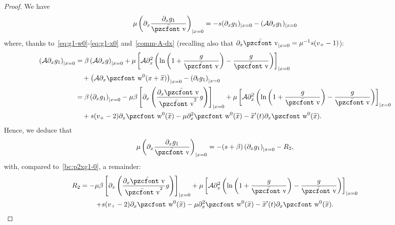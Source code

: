 \documentclass[10pt]{amsart}
\theoremstyle{definition}\newtheorem{defi}[theo]{Definition}\newtheorem{rema}[theo]{Remark}\newtheorem{exam}[theo]{Example}\newtheorem{exem}[theo]{Example}\newtheorem{nota}[theo]{Notation}
\newcommand{\mathpzc}[1]{\text{\pzcfont #1}}
\newcommand{\bv}{\bar{\mathpzc{v}}}
\newcommand{\cA}{\mathcal A}
\newcommand{\tw}{\mathpzc{w}}
\newcommand{\tx}{\widetilde{x}}
\begin{document}
\begin{proof}
We have
\[
\mu \left(\partial_x\dfrac{\partial_x g_1}{\bv}\right)_{|x=0} = -s (\partial_x g_1)_{|x=0} - (\cA \partial_x g_1)_{|x=0}
\]
where, thanks to~\eqref{eq:g1-w0}-\eqref{eq:g1-x0} and~\eqref{comm-A-dx} (recalling also that $\partial_x \bv_{|x=0} = \mu^{-1}s(v_+-1)$):
\begin{align*}
\left(\cA \partial_x g_1\right)_{|x=0} & =
\beta \left(\cA \partial_x g\right)_{|x=0} + \mu \left[\cA \partial^2_x \left(\ln \left(1+ \frac{g}{\bv}\right) - \frac{g}{\bv} \right) \right]_{|x=0} \\
& \quad + \left(\cA \partial_x \tw^0(x+\tx)\right)_{|x=0} - \left(\partial_t g_1\right)_{|x=0} \\
& = \beta \left(\partial_x g_1\right)_{|x=0} - \mu \beta \left[\partial_x \left(\dfrac{\partial_x \bv}{\bv^2} g\right)\right]_{|x=0} + \mu \left[\cA \partial^2_x \left(\ln \left(1+ \frac{g}{\bv}\right) - \frac{g}{\bv} \right) \right]_{|x=0} \\
& \quad + s (v_+-2) \partial_x \tw^0(\tx) - \mu \partial^2_x \tw^0(\tx) - \tx'(t) \partial_x \tw^0(\tx).
\end{align*}
Hence, we deduce that
\begin{equation}\label{bc:p2xg1-w0}
\mu \left(\partial_x\dfrac{\partial_x g_1}{\bv}\right)_{|x=0} = -(s+\beta) \left(\partial_x g_1\right)_{|x=0} - R_2,
\end{equation}
with, compared to~\eqref{bc:p2xg1-0}, a remainder:
\begin{multline*}
R_2  = -\mu \beta \left[\partial_x \left(\dfrac{\partial_x \bv}{\bv^2} g\right)\right]_{|x=0} + \mu \left[\cA \partial^2_x \left(\ln \left(1+ \frac{g}{\bv}\right) - \frac{g}{\bv} \right) \right]_{|x=0} \\
 + s (v_+-2) \partial_x \tw^0(\tx) - \mu \partial^2_x \tw^0(\tx) - \tx'(t) \partial_x \tw^0(\tx).
\end{multline*}


\end{proof}
\end{document}
